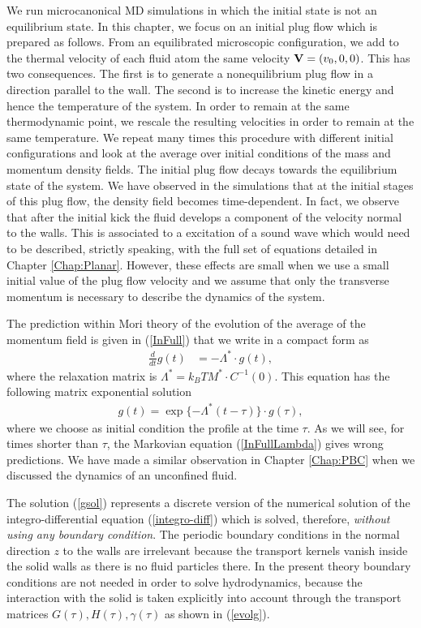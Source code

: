 \documentclass[b5paper,openright,10pt]{book}
\newcommand{\esc}{\!\cdot\!}
\begin{document}
We run microcanonical MD simulations in which the initial state is not
an equilibrium state. In this chapter, we focus on an initial plug flow
which  is  prepared  as  follows.  From  an  equilibrated  microscopic
configuration, we add  to the thermal velocity of each  fluid atom the
same velocity  ${\bf V}=(v_0,0,0)$.   This has two  consequences.  The
first  is to  generate  a  nonequilibrium plug  flow  in a  direction
parallel to  the wall.  The second  is to increase the  kinetic energy
and hence  the temperature of  the system. In  order to remain  at the
same thermodynamic point, we rescale the resulting velocities in order
to  remain  at  the  same  temperature.  We  repeat  many  times  this
procedure  with  different  initial  configurations and  look  at  the
average  over initial  conditions  of the  mass  and momentum  density
fields. The initial plug flow  decays towards the equilibrium state of
the system.  We  have observed in the simulations that  at the initial
stages of this plug flow, the density field becomes time-dependent. In
fact, we  observe that  after the  initial kick  the fluid  develops a
component of the velocity normal to the walls. This is associated to a
excitation of a sound wave which  would need to be described, strictly
speaking, with the full set of  equations detailed in Chapter \ref{Chap:Planar}. However,
these effects are small when we use  a small initial value of the plug
flow  velocity and  we assume  that  only the  transverse momentum  is
necessary to describe the dynamics of the system.

The prediction within  Mori theory of the evolution of  the average of
the momentum  field is given  in (\ref{InFull})  that we write  in a
compact form as
\begin{align}
 \frac{d}{dt}g(t)&= -\Lambda^* \esc g(t) ,
\label{InFullLambda}
\end{align}
where  the relaxation  matrix is $\Lambda^*=k_BT M^*\esc  C^{-1}(0)$.
This equation has the following matrix exponential solution
\begin{align}
  g(t)=\exp\{-\Lambda^* (t-\tau)\}\esc g(\tau),
\label{gsol}
\end{align}
where  we  choose  as  initial  condition  the  profile  at  the  time
$\tau$. As we  will see, for times shorter than  $\tau$, the Markovian
equation (\ref{InFullLambda}) gives wrong predictions.  We have made a
similar  observation  in Chapter \ref{Chap:PBC}  when  we  discussed  the dynamics  of  an
unconfined fluid.


The  solution  (\ref{gsol})  represents  a  discrete  version  of  the
numerical    solution    of    the    integro-differential    equation
(\ref{integro-diff}) which is solved, therefore, \textit{without using
  any boundary  condition}.  The  periodic boundary conditions  in the
normal direction $z$ to the walls are irrelevant because the transport
kernels vanish inside  the solid walls as there is  no fluid particles
there.  In  the present theory  boundary conditions are not  needed in
order to solve  hydrodynamics, because the interaction  with the solid
is  taken  explicitly  into  account through  the  transport  matrices
$G(\tau),H(\tau),\gamma(\tau)$ as shown in (\ref{evolg}).
\end{document}
